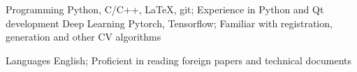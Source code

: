 

\begin{cvskills}




  \cvskill
    {Programming} %
    {Python, C/C++, LaTeX, git; Experience in Python and Qt development} %
  \cvskill
  {Deep Learning} %
  {Pytorch, Tensorflow; Familiar with registration, generation and other CV algorithms} %

  \cvskill
    {Languages} %
    {English; Proficient in reading foreign papers and technical documents} %

\end{cvskills}
